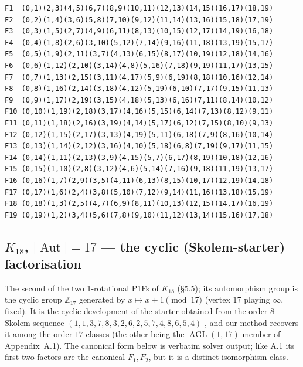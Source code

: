 \documentclass[11pt,reqno]{amsart}
\theoremstyle{plain}
\theoremstyle{definition}
\numberwithin{theorem}{section}
\newcommand{\Aut}{\operatorname{Aut}}
\newcommand{\AGL}{\operatorname{AGL}}
\begin{document}
{\scriptsize\begin{verbatim}
F1  (0,1)(2,3)(4,5)(6,7)(8,9)(10,11)(12,13)(14,15)(16,17)(18,19)
F2  (0,2)(1,4)(3,6)(5,8)(7,10)(9,12)(11,14)(13,16)(15,18)(17,19)
F3  (0,3)(1,5)(2,7)(4,9)(6,11)(8,13)(10,15)(12,17)(14,19)(16,18)
F4  (0,4)(1,8)(2,6)(3,10)(5,12)(7,14)(9,16)(11,18)(13,19)(15,17)
F5  (0,5)(1,9)(2,11)(3,7)(4,13)(6,15)(8,17)(10,19)(12,18)(14,16)
F6  (0,6)(1,12)(2,10)(3,14)(4,8)(5,16)(7,18)(9,19)(11,17)(13,15)
F7  (0,7)(1,13)(2,15)(3,11)(4,17)(5,9)(6,19)(8,18)(10,16)(12,14)
F8  (0,8)(1,16)(2,14)(3,18)(4,12)(5,19)(6,10)(7,17)(9,15)(11,13)
F9  (0,9)(1,17)(2,19)(3,15)(4,18)(5,13)(6,16)(7,11)(8,14)(10,12)
F10 (0,10)(1,19)(2,18)(3,17)(4,16)(5,15)(6,14)(7,13)(8,12)(9,11)
F11 (0,11)(1,18)(2,16)(3,19)(4,14)(5,17)(6,12)(7,15)(8,10)(9,13)
F12 (0,12)(1,15)(2,17)(3,13)(4,19)(5,11)(6,18)(7,9)(8,16)(10,14)
F13 (0,13)(1,14)(2,12)(3,16)(4,10)(5,18)(6,8)(7,19)(9,17)(11,15)
F14 (0,14)(1,11)(2,13)(3,9)(4,15)(5,7)(6,17)(8,19)(10,18)(12,16)
F15 (0,15)(1,10)(2,8)(3,12)(4,6)(5,14)(7,16)(9,18)(11,19)(13,17)
F16 (0,16)(1,7)(2,9)(3,5)(4,11)(6,13)(8,15)(10,17)(12,19)(14,18)
F17 (0,17)(1,6)(2,4)(3,8)(5,10)(7,12)(9,14)(11,16)(13,18)(15,19)
F18 (0,18)(1,3)(2,5)(4,7)(6,9)(8,11)(10,13)(12,15)(14,17)(16,19)
F19 (0,19)(1,2)(3,4)(5,6)(7,8)(9,10)(11,12)(13,14)(15,16)(17,18)
\end{verbatim}}

\subsection{$K_{18}$, $|\Aut|=17$ --- the cyclic (Skolem-starter) factorisation}

The second of the two 1-rotational P1Fs of $K_{18}$ (\S5.5); its automorphism group is the
cyclic group $\mathbb{Z}_{17}$ generated by $x\mapsto x+1\pmod{17}$ (vertex $17$ playing
$\infty$, fixed). It is the cyclic development of the starter obtained from the order-$8$ Skolem
sequence $(1,1,3,7,8,3,2,6,2,5,7,4,8,6,5,4)$ \cite{PikeShalaby}, and our method recovers it among
the order-$17$ classes (the other being the $\AGL(1,17)$ member of Appendix~A.1). The
canonical form below is verbatim solver output; like A.1 its first two factors are the canonical
$F_1,F_2$, but it is a distinct isomorphism class.
\end{document}
